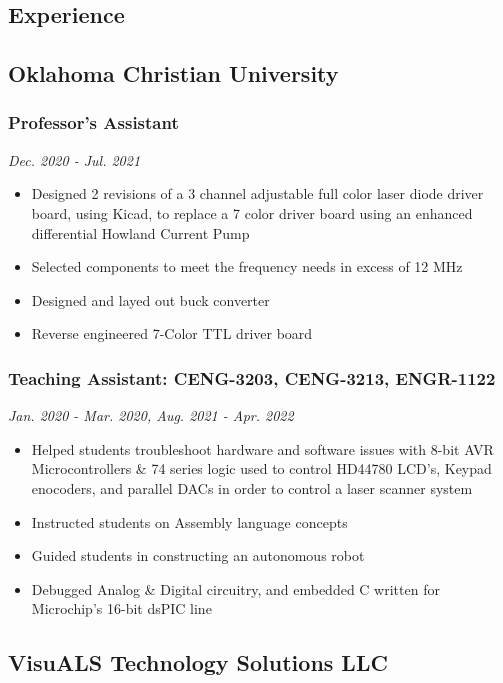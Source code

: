 \documentclass{article}
\begin{document}
\begin{spacing}{.5}
\section{Experience}
	\subsection{Oklahoma Christian University}
		\subsubsection{\large{Professor's Assistant}} \hfill \small{\textsl{Dec. 2020 - Jul. 2021}}
			\begin{itemize}[label=--,itemsep=-.35ex]
				\item \large{Designed 2 revisions of a 3 channel adjustable full color laser diode driver board, using Kicad, to replace a 7 color driver board using an enhanced differential Howland Current Pump}
				\item \large{Selected components to meet the frequency needs in excess of 12 MHz}
				\item \large{Designed and layed out buck converter}
				\item \large{Reverse engineered 7-Color TTL driver board}
			\end{itemize}
		\subsubsection{\large{Teaching Assistant: CENG-3203, CENG-3213, ENGR-1122}} \hfill \small{\textsl{Jan. 2020 - Mar. 2020, Aug. 2021 - Apr. 2022}}
			\begin{itemize}[label=--,itemsep=-.35ex]
				\item \large{Helped students troubleshoot hardware and software issues with 8-bit AVR Microcontrollers \& 74 series logic used to control HD44780 LCD's, Keypad enocoders, and parallel DACs in order to control a laser scanner system}
				\item \large{Instructed students on Assembly language concepts}
				\item \large{Guided students in constructing an autonomous robot}
				\item \large{Debugged Analog \& Digital circuitry, and embedded C written for Microchip's 16-bit dsPIC line}
			\end{itemize}
	\subsection{VisuALS Technology Solutions LLC}

\end{spacing}
\end{document}
